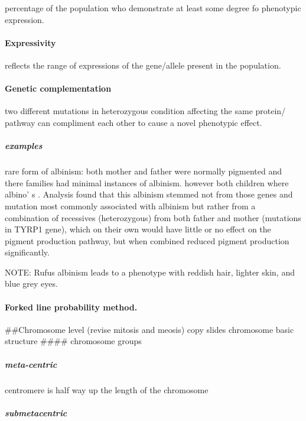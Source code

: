 \documentclass[]{article}
\let\oldparagraph\paragraph
\renewcommand{\paragraph}[1]{\oldparagraph{#1}\mbox{}}
\let\oldsubparagraph\subparagraph
\renewcommand{\subparagraph}[1]{\oldsubparagraph{#1}\mbox{}}
\begin{document}
percentage of the population who demonstrate at least some degree fo
phenotypic expression.

\hypertarget{expressivity-1}{%
\paragraph{Expressivity}\label{expressivity-1}}

reflects the range of expressions of the gene/allele present in the
population.

\hypertarget{genetic-complementation-1}{%
\paragraph{Genetic complementation}\label{genetic-complementation-1}}

two different mutations in heterozygous condition affecting the same
protein/ pathway can compliment each other to cause a novel phenotypic
effect.

\hypertarget{examples-6}{%
\subparagraph{examples}\label{examples-6}}

rare form of albinism: both mother and father were normally pigmented
and there families had minimal instances of albinism. however both
children where albino' s . Analysis found that this albinism stemmed not
from those genes and mutation most commonly associated with albinism but
rather from a combination of recessives (heterozygous) from both father
and mother (mutations in TYRP1 gene), which on their own would have
little or no effect on the pigment production pathway, but when combined
reduced pigment production significantly.

NOTE: Rufus albinism leads to a phenotype with reddish hair, lighter
skin, and blue grey eyes.

\hypertarget{forked-line-probability-method.-1}{%
\paragraph{Forked line probability
method.}\label{forked-line-probability-method.-1}}

\#\#Chromosome level (revise mitosis and meosis) copy slides chromosome
basic structure \#\#\#\# chromosome groups

\hypertarget{meta-centric-1}{%
\subparagraph{meta-centric}\label{meta-centric-1}}

centromere is half way up the length of the chromosome

\hypertarget{submetacentric-1}{%
\subparagraph{submetacentric}\label{submetacentric-1}}
\end{document}
